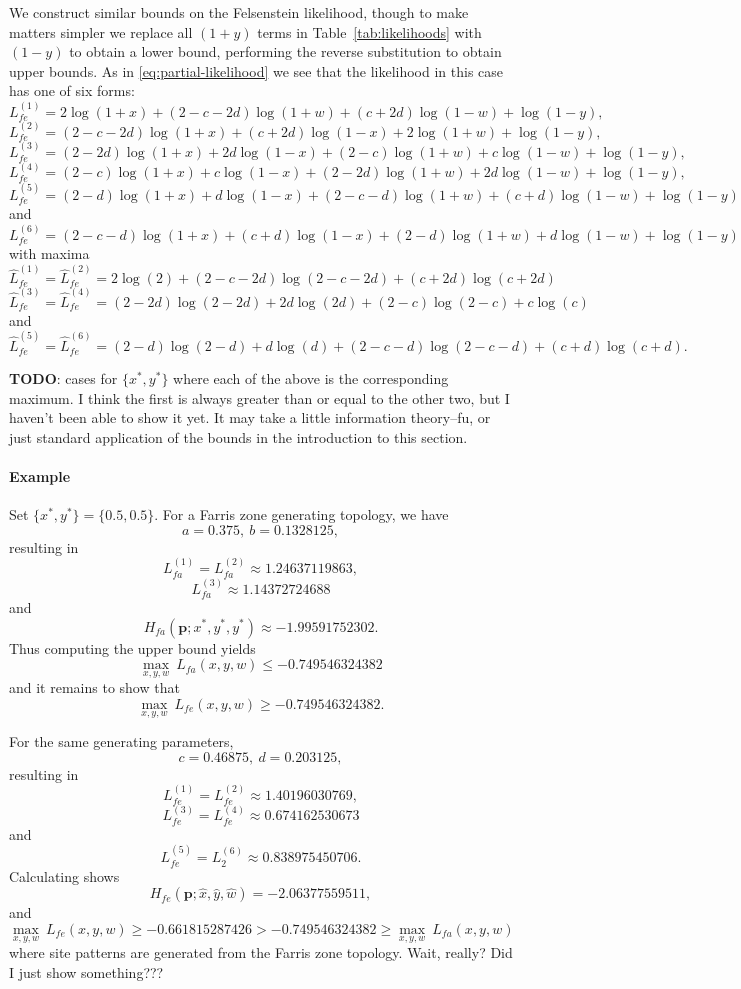 \documentclass[a4paper]{article}
\begin{document}
We construct similar bounds on the Felsenstein likelihood, though to make matters simpler we replace all $(1+y)$ terms in Table~\ref{tab:likelihoods} with $(1-y)$ to obtain a lower bound, performing the reverse substitution to obtain upper bounds.
As in \eqref{eq:partial-likelihood} we see that the likelihood in this case has one of six forms:
$$
L_{fe}^{(1)} = 2\log(1+x)+(2-c-2d)\log(1+w)+(c+2d)\log(1-w)+\log(1-y),
$$
$$
L_{fe}^{(2)} = (2-c-2d)\log(1+x)+(c+2d)\log(1-x)+2\log(1+w)+\log(1-y),
$$
$$
L_{fe}^{(3)} = (2-2d)\log(1+x)+2d\log(1-x)+(2-c)\log(1+w)+c\log(1-w)+\log(1-y),
$$
$$
L_{fe}^{(4)} = (2-c)\log(1+x)+c\log(1-x)+(2-2d)\log(1+w)+2d\log(1-w)+\log(1-y),
$$
$$
L_{fe}^{(5)} = (2-d)\log(1+x)+d\log(1-x)+(2-c-d)\log(1+w)+(c+d)\log(1-w)+\log(1-y)
$$
and
$$
L_{fe}^{(6)} = (2-c-d)\log(1+x)+(c+d)\log(1-x)+(2-d)\log(1+w)+d\log(1-w)+\log(1-y)
$$
with maxima
$$
\hat{L}_{fe}^{(1)} = \hat{L}_{fe}^{(2)} = 2\log(2)+(2-c-2d)\log(2-c-2d)+(c+2d)\log(c+2d)
$$
$$
\hat{L}_{fe}^{(3)} = \hat{L}_{fe}^{(4)} = (2-2d)\log(2-2d)+2d\log(2d)+(2-c)\log(2-c)+c\log(c)
$$
and
$$
\hat{L}_{fe}^{(5)} = \hat{L}_{fe}^{(6)} = (2-d)\log(2-d)+d\log(d)+(2-c-d)\log(2-c-d)+(c+d)\log(c+d).
$$

\textbf{TODO}: cases for $\{x^{*}, y^{*}\}$ where each of the above is the corresponding maximum.
I think the first is always greater than or equal to the other two, but I haven't been able to show it yet.
It may take a little information theory--fu, or just standard application of the bounds in the introduction to this section.

\paragraph{Example}

Set $\{x^*, y^*\} = \{0.5, 0.5\}$.
For a Farris zone generating topology, we have
$$
a =  0.375, \ b =  0.1328125,
$$
resulting in
$$
L_{fa}^{(1)} = L_{fa}^{(2)} \approx 1.24637119863,
$$
$$
L_{fa}^{(3)} \approx 1.14372724688
$$
and
$$
H_{fa}(\mathbf{p};x^*,y^*, y^*) \approx -1.99591752302.
$$
Thus computing the upper bound yields
$$
\max_{x,y,w} \ L_{fa}(x,y,w) \le -0.749546324382
$$
and it remains to show that 
$$
\max_{x,y,w} \ L_{fe}(x,y,w) \ge -0.749546324382.
$$

For the same generating parameters,
$$
c = 0.46875, \ d = 0.203125,
$$
resulting in
$$
L_{fe}^{(1)} = L_{fe}^{(2)} \approx 1.40196030769, 
$$
$$
L_{fe}^{(3)} = L_{fe}^{(4)} \approx 0.674162530673
$$
and
$$
L_{fe}^{(5)} = L_2^{(6)} \approx 0.838975450706.
$$
Calculating shows
$$
H_{fe}(\mathbf{p}; \hat{x}, \hat{y}, \hat{w}) = -2.06377559511,
$$
and
$$
\max_{x,y,w} \ L_{fe}(x,y,w) \ge -0.661815287426 > -0.749546324382 \ge \max_{x,y,w} \ L_{fa}(x,y,w)
$$
where site patterns are generated from the Farris zone topology.
Wait, really?
Did I just show something???
\end{document}
